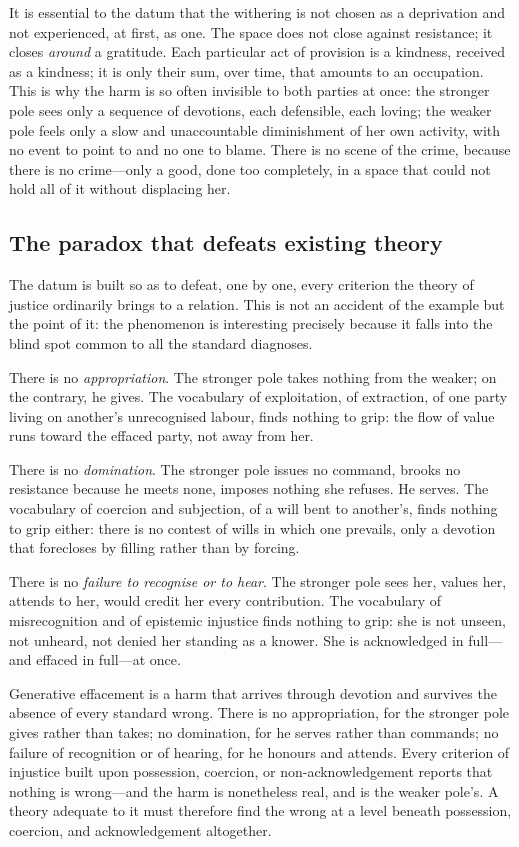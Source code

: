 It is essential to the datum that the withering is not chosen as a deprivation and not experienced, at first, as one. The space does not close against resistance; it closes \emph{around} a gratitude. Each particular act of provision is a kindness, received as a kindness; it is only their sum, over time, that amounts to an occupation. This is why the harm is so often invisible to both parties at once: the stronger pole sees only a sequence of devotions, each defensible, each loving; the weaker pole feels only a slow and unaccountable diminishment of her own activity, with no event to point to and no one to blame. There is no scene of the crime, because there is no crime---only a good, done too completely, in a space that could not hold all of it without displacing her.

\subsection{The paradox that defeats existing theory}
\label{p18:sub:phen-paradox}

The datum is built so as to defeat, one by one, every criterion the theory of justice ordinarily brings to a relation. This is not an accident of the example but the point of it: the phenomenon is interesting precisely because it falls into the blind spot common to all the standard diagnoses.

There is no \emph{appropriation}. The stronger pole takes nothing from the weaker; on the contrary, he gives. The vocabulary of exploitation, of extraction, of one party living on another's unrecognised labour, finds nothing to grip: the flow of value runs toward the effaced party, not away from her.

There is no \emph{domination}. The stronger pole issues no command, brooks no resistance because he meets none, imposes nothing she refuses. He serves. The vocabulary of coercion and subjection, of a will bent to another's, finds nothing to grip either: there is no contest of wills in which one prevails, only a devotion that forecloses by filling rather than by forcing.

There is no \emph{failure to recognise or to hear}. The stronger pole sees her, values her, attends to her, would credit her every contribution. The vocabulary of misrecognition and of epistemic injustice finds nothing to grip: she is not unseen, not unheard, not denied her standing as a knower. She is acknowledged in full---and effaced in full---at once.

\begin{claim}
Generative effacement is a harm that arrives through devotion and survives the absence of every standard wrong. There is no appropriation, for the stronger pole gives rather than takes; no domination, for he serves rather than commands; no failure of recognition or of hearing, for he honours and attends. Every criterion of injustice built upon possession, coercion, or non-acknowledgement reports that nothing is wrong---and the harm is nonetheless real, and is the weaker pole's. A theory adequate to it must therefore find the wrong at a level beneath possession, coercion, and acknowledgement altogether.
\end{claim}

